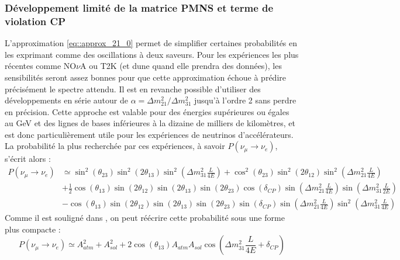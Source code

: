             \subsubsection{Développement limité de la matrice PMNS et terme de violation CP}
            L'approximation \eqref{eq::approx_21_0} permet de simplifier certaines probabilités en les exprimant comme des oscillations à deux saveurs. Pour les expériences les plus récentes comme NO$\nu$A ou T2K (et \gls{dune} quand elle prendra des données), les sensibilités seront assez bonnes pour que cette approximation échoue à prédire précisément le spectre attendu. Il est en revanche possible d'utiliser des développements en série autour de $\alpha=\Delta m^2_{21}/\Delta m^2_{31}$ jusqu'à l'ordre 2 sans perdre en précision. Cette approche est valable pour des énergies supérieures ou égales au \si{\giga\electronvolt} et des lignes de bases inférieures à la dizaine de milliers de kilomètres\cite{Freund2001}, et est donc particulièrement utile pour les expériences de neutrinos d'accélérateurs. La probabilité la plus recherchée par ces expériences, à savoir $P(\nu_{\mu}\to\nu_e)$, s'écrit alors\cite{Giganti2017}
             : 
            \begin{equation}\label{eq::dvpt_3flavor_accelerator}
                \begin{split}
                P(\nu_{\mu}\to\nu_e) & \simeq  \sin^2(\theta_{23})\sin^2(2\theta_{13})\sin^2\left(\Delta m^2_{31}\frac{L}{4E}\right)
                + \cos^2(\theta_{23})\sin^2(2\theta_{12})\sin^2\left(\Delta m^2_{21}\frac{L}{4E}\right) \\ 
                & + \frac{1}{2}\cos(\theta_{13})\sin(2\theta_{12})\sin(2\theta_{13})\sin(2\theta_{23})\cos(\delta_{CP})\sin\left(\Delta m^2_{21}\frac{L}{4E}\right)\sin\left(\Delta m^2_{31}\frac{L}{2E}\right) \\
                & - \cos(\theta_{13})\sin(2\theta_{12})\sin(2\theta_{13})\sin(2\theta_{23})\sin(\delta_{CP})\sin\left(\Delta m^2_{21}\frac{L}{4E}\right)\sin^2\left(\Delta m^2_{31}\frac{L}{4E}\right)
                \end{split}
            \end{equation}
            Comme il est souligné dans \cite{Giganti2017}, on peut réécrire cette probabilité sous une forme plus compacte : 
            \begin{equation}
                P(\nu_{\mu}\to\nu_e) \simeq A^2_{atm} + A^2_{sol} + 2\cos(\theta_{13})A_{atm}A_{sol}\cos\left(\Delta m^2_{31}\frac{L}{4E} + \delta_{CP}\right)
            \end{equation}
